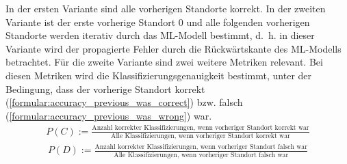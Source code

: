 In der ersten Variante sind alle vorherigen Standorte korrekt.
In der zweiten Variante ist der erste vorherige Standort 0 und alle folgenden vorherigen Standorte werden iterativ durch das ML-Modell bestimmt,
d.~h. in dieser Variante wird der propagierte Fehler durch die Rückwärtskante des ML-Modells betrachtet.
\newline
\newline
Für die zweite Variante sind zwei weitere Metriken relevant.
Bei diesen Metriken wird die Klassifizierungsgenauigkeit bestimmt, unter der Bedingung, dass der vorherige
Standort korrekt (\ref{formular:accuracy_previous_was_correct}) bzw. falsch (\ref{formular:accuracy_previous_was_wrong}) war.
\begin{align}
    \label{formular:accuracy_previous_was_correct}
    P(C) := \frac{\text{Anzahl korrekter Klassifizierungen, wenn vorheriger Standort korrekt war}}{\text{Alle Klassifizierungen, wenn vorheriger Standort korrekt war}}
\end{align}
\begin{align}
    \label{formular:accuracy_previous_was_wrong}
    P(D) := \frac{\text{Anzahl korrekter Klassifizierungen, wenn vorheriger Standort falsch war}}{\text{Alle Klassifizierungen, wenn vorheriger Standort falsch war}}
\end{align}